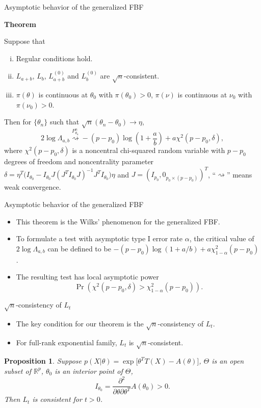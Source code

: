 \documentclass{beamer}
\theoremstyle{plain}
\newtheorem{proposition}{ Proposition}
\theoremstyle{definition}
\theoremstyle{remark}
\begin{document}
\begin{frame}{Asymptotic behavior of the generalized FBF}

    \textbf{Theorem}

        Suppose that
        \begin{enumerate}[(i)]
            \item
                Regular conditions hold.
            \item
                $L_{a+b}$, $L_b$, $L_{a+b}^{(0)}$ and $L_b^{(0)}$ are $\sqrt{n}$-consistent.
            \item
                $\pi(\theta)$ is continuous at $\theta_0$ with $\pi(\theta_0)>0$, $\pi(\nu)$ is continuous at $\nu_0$ with $\pi(\nu_0)>0$.
            \end{enumerate}
                Then for $\{\theta_n\}$ such that $\sqrt{n}(\theta_n-\theta_0)\to \eta$, 
        $$
        2\log \Lambda_{a,b}\overset{P^n_{\theta_n}}{\rightsquigarrow}-{(p-p_0)}\log (1+\frac{a}{b})+{a}\chi^2(p-p_0,\delta),
        $$
        where $\chi^2(p-p_0,\delta)$ is a noncentral chi-squared random variable with $p-p_0$ degrees of freedom and noncentrality parameter $\delta=\eta^T\big( I_{\theta_0}-I_{\theta_0} J(J^T I_{\theta_0} J)^{-1}J^T I_{\theta_0}\big)\eta$ and $J=(I_{p_0},0_{p_0\times(p-p_0)})^T$,
``$\rightsquigarrow$'' means weak convergence.
\end{frame}
\begin{frame}{Asymptotic behavior of the generalized FBF}
    \begin{itemize}
        \item
    This theorem is the Wilks' phenomenon for the generalized FBF.
        \item
    To formulate a test with asymptotic type I error rate $\alpha$, the critical value of $2\log \Lambda_{a,b}$ can be defined to be $-(p-p_0)\log (1+a/b)+ a\chi^2_{1-\alpha}(p-p_0)$.
        \item
The resulting test has local asymptotic power
\begin{equation*}
\Pr \left( \chi^2(p-p_0,\delta)> \chi^2_{1-\alpha}(p-p_0) \right).
\end{equation*}
    \end{itemize}
\end{frame}
\begin{frame}{$\sqrt{n}$-consistency of $L_t$}
    \begin{itemize}
        \item
    The key condition for our theorem is the $\sqrt{n}$-consistency of $L_t$.
        \item
    For full-rank exponential family, $L_t$ is $\sqrt{n}$-consistent.
    \end{itemize}
\begin{proposition}\label{exponentialCon}
    Suppose $p(X|\theta)=\exp\big[\theta^T T(X)-A(\theta)\big]$, $\Theta$ is an open subset of $\mathbb{R}^p$, $\theta_0$ is an interior point of $\Theta$, 
    $$I_{\theta_0}=\frac{\partial^2}{\partial \theta \partial \theta^T} A(\theta_0)>0.$$
    Then $L_{t}$ is consistent for $t>0$.
\end{proposition}
\end{frame}
\end{document}
